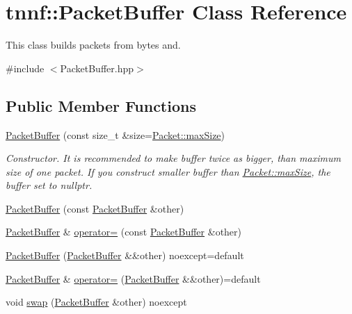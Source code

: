 \hypertarget{classtnnf_1_1_packet_buffer}{}\section{tnnf\+:\+:Packet\+Buffer Class Reference}
\label{classtnnf_1_1_packet_buffer}


This class builds packets from bytes and.  




{\ttfamily \#include $<$Packet\+Buffer.\+hpp$>$}

\subsection*{Public Member Functions}
\begin{DoxyCompactItemize}
\item 
\hyperlink{classtnnf_1_1_packet_buffer_a8ac26d292ab3f11539b2e8302ab65bc3}{Packet\+Buffer} (const size\+\_\+t \&size=\hyperlink{classtnnf_1_1_packet_a10b2f3efc472cddea13827383b65c8d5}{Packet\+::max\+Size})
\begin{DoxyCompactList}\small\item\em Constructor. It is recommended to make buffer twice as bigger, than maximum size of one packet. If you construct smaller buffer than \hyperlink{classtnnf_1_1_packet_a10b2f3efc472cddea13827383b65c8d5}{Packet\+::max\+Size}, the buffer set to nullptr. \end{DoxyCompactList}\item 
\hyperlink{classtnnf_1_1_packet_buffer_a892f415322e2f32cfba6d7bdb934ac0f}{Packet\+Buffer} (const \hyperlink{classtnnf_1_1_packet_buffer}{Packet\+Buffer} \&other)
\item 
\hyperlink{classtnnf_1_1_packet_buffer}{Packet\+Buffer} \& \hyperlink{classtnnf_1_1_packet_buffer_af6d732cc17100784233c65c82fd90bb6}{operator=} (const \hyperlink{classtnnf_1_1_packet_buffer}{Packet\+Buffer} \&other)
\item 
\hyperlink{classtnnf_1_1_packet_buffer_afd0ff3698fdf42c5370e1ec6f1ac0949}{Packet\+Buffer} (\hyperlink{classtnnf_1_1_packet_buffer}{Packet\+Buffer} \&\&other) noexcept=default
\item 
\hyperlink{classtnnf_1_1_packet_buffer}{Packet\+Buffer} \& \hyperlink{classtnnf_1_1_packet_buffer_abec02d87379db8003088e1ddbfe45fa9}{operator=} (\hyperlink{classtnnf_1_1_packet_buffer}{Packet\+Buffer} \&\&other)=default
\item 
void \hyperlink{classtnnf_1_1_packet_buffer_af026e44a3d993d4cc9e2a1bafdab2b86}{swap} (\hyperlink{classtnnf_1_1_packet_buffer}{Packet\+Buffer} \&other) noexcept

\end{DoxyCompactItemize}

